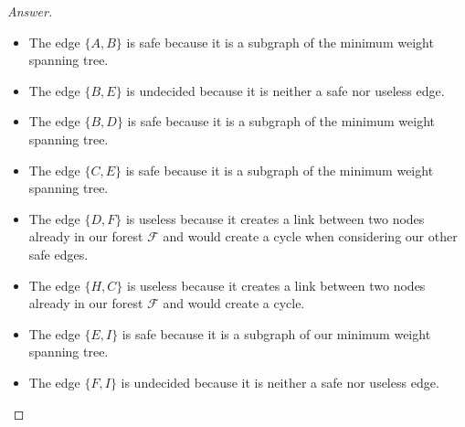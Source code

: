 \documentclass[11pt]{article}
\theoremstyle{definition}
\theoremstyle{definition}
\theoremstyle{definition}
\begin{document}
\begin{proof}[Answer]
\begin{itemize}
\item The edge $\{A, B\}$ is safe %
because it is a subgraph of the minimum weight spanning tree. %
\item The edge $\{B, E\}$ is undecided %
because it is neither a safe nor useless edge. %
\item The edge $\{B, D\}$ is safe %
because it is a subgraph of the minimum weight spanning tree. %
\item The edge $\{C, E\}$ is safe %
because it is a subgraph of the minimum weight spanning tree. %
\item The edge $\{D, F\}$ is useless %
because it creates a link between two nodes already in our forest $\mathcal{F}$ and would create a cycle when considering our other safe edges. %
\item The edge $\{H, C\}$ is useless %
because it creates a link between two nodes already in our forest $\mathcal{F}$ and would create a cycle. %
\item The edge $\{E, I\}$ is safe %
because it is a subgraph of our minimum weight spanning tree. %
\item The edge $\{F, I\}$ is undecided %
because it is neither a safe nor useless edge. %
\end{itemize}
\end{proof}


\end{document}
